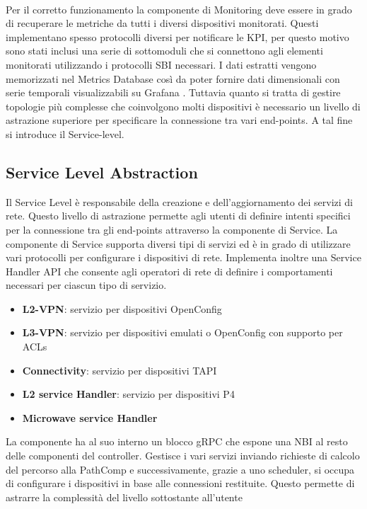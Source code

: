 \\Per il corretto funzionamento la componente di Monitoring deve essere in grado di recuperare le metriche da tutti i diversi dispositivi monitorati.
Questi implementano spesso protocolli diversi per notificare le KPI, per questo motivo sono stati inclusi una serie di sottomoduli che si connettono 
agli elementi monitorati utilizzando i protocolli SBI necessari. I dati estratti vengono memorizzati nel Metrics Database così da poter fornire dati dimensionali 
con serie temporali visualizzabili su Grafana \cite{grafana}.
Tuttavia quanto si tratta di gestire topologie più complesse che coinvolgono molti dispositivi è necessario un livello di astrazione superiore per specificare la connessione tra vari end-points. A tal fine si introduce il Service-level. 

\subsection{Service Level Abstraction}
Il Service Level è responsabile della creazione e dell'aggiornamento dei servizi di rete.
Questo livello di astrazione permette agli utenti di definire intenti specifici per la connessione tra gli end-points attraverso la componente di Service.
La componente di Service supporta diversi tipi di servizi ed è in grado di utilizzare vari protocolli per configurare i dispositivi di rete.
Implementa inoltre una Service Handler API che consente agli operatori di rete di definire i comportamenti necessari per ciascun tipo di servizio.
\begin{itemize}
    \item \textbf{L2-VPN}: servizio per dispositivi OpenConfig
    \item \textbf{L3-VPN}: servizio per dispositivi emulati o OpenConfig con supporto per ACLs
    \item \textbf{Connectivity}: servizio per dispositivi TAPI
    \item \textbf{L2 service Handler}: servizio per dispositivi P4
    \item \textbf{Microwave service Handler}
\end{itemize}
La componente ha al suo interno un blocco gRPC che espone una NBI al resto delle componenti del controller. 
Gestisce i vari servizi inviando richieste di calcolo del percorso alla PathComp e successivamente, grazie a uno scheduler, si occupa di
configurare i dispositivi in base alle connessioni restituite. Questo permette di astrarre la complessità del livello sottostante all'utente
